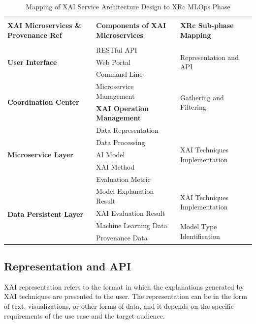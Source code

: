 \documentclass[conference]{IEEEtran}
\begin{document}
\begin{table}[htbp]
\caption{Mapping of XAI Service Architecture Design to XRc MLOps Phase}
\begin{center}
\label{Mapping}
\begin{tabular}{|l|l|l|}
\hline
 & & \\
\textbf{XAI Microservices \& Provenance Ref} & \textbf{Components of XAI Microservices}  & \textbf{XRc Sub-phase Mapping} \\
 & & \\ \hline
\multirow{3}{*}{\textbf{User Interface}} & RESTful API & \multirow{3}{*}{Representation and API} \\
 & Web Portal & \\
 & Command Line & \\ \hline 
\multirow{4}{*}{\textbf{Coordination Center}} & \multirow{2}{*}{Microservice Management} & \multirow{4}{*}{Gathering and Filtering} \\
 & & \\
 & \multirow{2}{*}{\textbf{XAI Operation Management}} & \\
 & & \\ \hline 
\multirow{5}{*}{\textbf{Microservice Layer}} & Data Representation & \multirow{5}{*}{XAI Techniques Implementation} \\
 & Data Processing & \\
 & AI Model & \\
 & XAI Method & \\
 & Evaluation Metric & \\ \hline
\multirow{4}{*}{\textbf{Data Persistent Layer}} & Model Explanation Result & \multirow{2}{*}{XAI Techniques Implementation} \\
 & XAI Evaluation Result & \\ \cline{2-3} 
 & Machine Learning Data & \multirow{2}{*}{Model Type Identification} \\
 & Provenance Data & \\ \hline
\end{tabular}
\end{center}
\end{table}
\subsection{Representation and API}
XAI representation refers to the format in which the explanations generated by XAI techniques are presented to the user. The representation can be in the form of text, visualizations, or other forms of data, and it depends on the specific requirements of the use case and the target audience.
\end{document}
